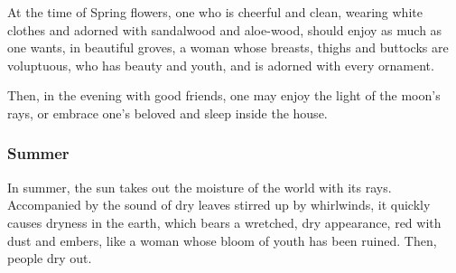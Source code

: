 \begin{translation}
	\item[46--47]
	At the time of Spring flowers, %
	one who is cheerful %
	and clean, %
	wearing white clothes and adorned with sandalwood and aloe-wood, should enjoy
	as much as one wants, %
	in beautiful groves, %
	a woman whose breasts, thighs and buttocks are voluptuous, %
	who has beauty and youth, and is adorned with every ornament.

	\item[48]
	Then, in the evening %
	with good friends, %
	one may enjoy %
	the light of the moon's rays, %
	or%
	embrace one's beloved and sleep inside the house. %

	\subsubsection{Summer}%

	\item[49-50]
	In summer, %
	the sun takes out %
	the moisture of the world %
	with its rays. %
	Accompanied by the sound of dry leaves stirred up %
	by whirlwinds, %
	it quickly causes dryness %
	in the earth, which bears a wretched, dry appearance, red with dust and embers, %
	like a woman whose bloom of youth has been ruined. %
	Then, people dry out. %


\end{translation}
